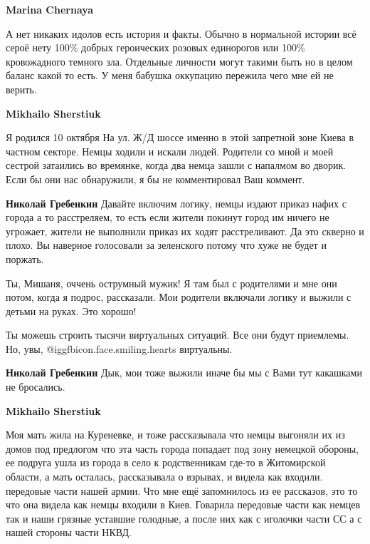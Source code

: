 \begin{itemize}
\begin{itemize}
\begin{itemize}
\textbf{Marina Chernaya} 

А нет никаких идолов есть история и факты. Обычно в нормальной истории всё
сероё нету 100\% добрых героических розовых единорогов или 100\% кровожадного
темного зла. Отдельные личности могут такими быть но в целом баланс какой то
есть. У меня бабушка оккупацию пережила чего мне ей не верить.
\end{itemize} %

\textbf{Mikhailo Sherstiuk} 

Я родился 10 октября На ул. Ж/Д шоссе именно в этой запретной зоне Киева в
частном секторе. Немцы ходили и искали людей. Родители со мной и моей сестрой
затаились во времянке, когда два немца зашли с напалмом во дворик. Если бы они
нас обнаружили, я бы не комментировал Ваш коммент.

\begin{itemize} %
\textbf{Николай Гребенкин} Давайте включим логику, немцы издают приказ нафих с города а то расстреляем, то есть если жители покинут город им ничего не угрожает, жители не выполнили приказ их ходят расстреливают. Да это скверно и плохо. Вы наверное голосовали за зеленского потому что хуже не будет и поржать.
\end{itemize} %


Ты, Мишаня, оччень острумный мужик! Я там был с родителями и мне они потом,
когда я подрос, рассказали. Мои родители включали логику и выжили с детьми на
руках. Это хорошо!

Ты можешь строить тысячи виртуальных ситуаций. Все они будут приемлемы. Но,
увы, @igg{fbicon.face.smiling.hearts}  виртуальны.

\textbf{Николай Гребенкин} Дык, мои тоже выжили иначе бы мы с Вами тут какашками не бросались.

\textbf{Mikhailo Sherstiuk} 

Моя мать жила на Куреневке, и тоже рассказывала что немцы выгоняли их из домов
под предлогом что эта часть города попадает под зону немецкой обороны, ее
подруга ушла из города в село к родственникам где-то в Житомирской области, а
мать осталась, рассказывала о взрывах, и видела как входили. передовые части
нашей армии. Что мне ещё запомнилось из ее рассказов, это то что она видела как
немцы входили в Киев. Говарила передовые части как немцев так и наши грязные
уставшие голодные, а после них как с иголочки части СС а с нашей стороны
части НКВД.


\end{itemize}
\end{itemize}
